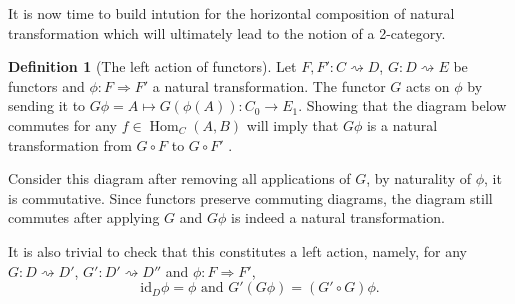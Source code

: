 \documentclass{article}
\newtheorem{prop}[thm]{Proposition}
\theoremstyle{definition}
\newtheorem{defn}[thm]{Definition}
\theoremstyle{remark}
\DeclareMathOperator{\Hom}{Hom}
\newcommand{\id}{\text{id}}
\begin{document}
%	

It is now time to build intution for the horizontal composition of natural transformation which will ultimately lead to the notion of a 2-category.
\begin{defn}[The left action of functors]
	Let $F,F':C\rightsquigarrow D$, $G:D\rightsquigarrow E$ be functors and $\phi:F\Rightarrow F'$ a natural transformation. The functor $G$ acts on $\phi$ by sending it to $G\phi = A \mapsto G(\phi(A)) : C_0 \rightarrow E_1$. Showing that the diagram below commutes for any $f \in \Hom_C(A,B)$ will imply that $G\phi$ is a natural transformation from $G\circ F$ to $G\circ F'$ .
	\begin{figure}[H]
		\centering
	\end{figure}
	
	Consider this diagram after removing all applications of $G$, by naturality of $\phi$, it is commutative. Since functors preserve commuting diagrams, the diagram still commutes after applying $G$ and $G\phi$ is indeed a natural transformation.
	
	It is also trivial to check that this constitutes a left action, namely, for any $G:D\rightsquigarrow D'$, $G':D' \rightsquigarrow D''$ and $\phi:F\Rightarrow F'$, \[\id_D\phi = \phi \text{ and } G'(G\phi)= (G' \circ G)\phi.\]
\end{defn}
\end{document}
